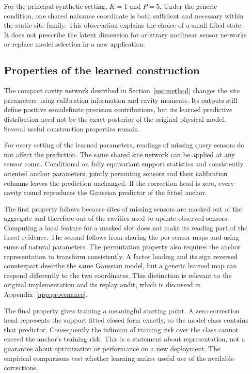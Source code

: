 For the principal synthetic setting, \(K=1\) and \(P=5\). Under the generic condition, one shared nuisance coordinate is both sufficient and necessary within the static site family. This observation explains the choice of a small lifted state. It does not prescribe the latent dimension for arbitrary nonlinear sensor networks or replace model selection in a new application.

\subsection{Properties of the learned construction}

The compact cavity network described in Section~\ref{sec:method} changes the site parameters using calibration information and cavity moments. Its outputs still define positive semidefinite precision contributions, but its learned predictive distribution need not be the exact posterior of the original physical model. Several useful construction properties remain.

\begin{proposition}
\label{prop:struct}
For every setting of the learned parameters, readings of missing query sensors do not affect the prediction. The same shared site network can be applied at any sensor count. Conditional on fully equivariant support statistics and consistently oriented anchor parameters, jointly permuting sensors and their calibration columns leaves the prediction unchanged. If the correction head is zero, every cavity round reproduces the Gaussian predictor of the fitted anchor.
\end{proposition}

The first property follows because sites of missing sensors are masked out of the aggregate and therefore out of the cavities used to update observed sensors. Computing a local feature for a masked slot does not make its reading part of the fused evidence. The second follows from sharing the per sensor maps and using sums of natural parameters. The permutation property also requires the anchor representation to transform consistently. A factor loading and its sign reversed counterpart describe the same Gaussian model, but a generic learned map can respond differently to the two coordinates. This distinction is relevant to the original implementation and its replay audit, which is discussed in Appendix~\ref{app:provenance}.

The final property gives training a meaningful starting point. A zero correction head represents the support fitted closed form exactly, so the model class contains that predictor. Consequently the infimum of training risk over the class cannot exceed the anchor's training risk. This is a statement about representation, not a guarantee about optimization or performance on a new deployment. The empirical comparisons test whether learning makes useful use of the available corrections.
